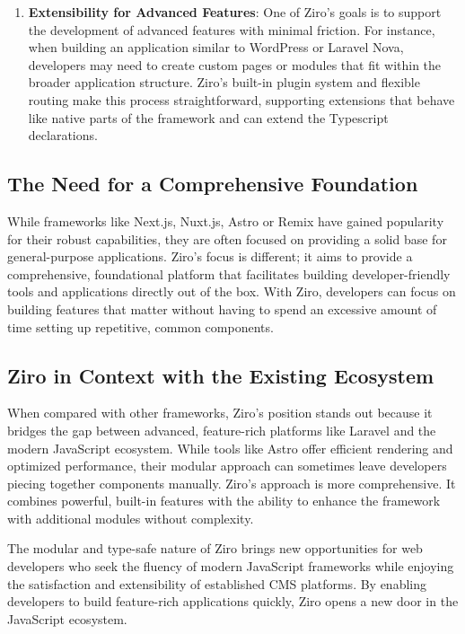 \begin{enumerate}
	\item \textbf{Extensibility for Advanced Features}: One of Ziro’s goals is to support the development of advanced features with minimal friction. For instance, when building an application similar to WordPress or Laravel Nova, developers may need to create custom pages or modules that fit within the broader application structure. Ziro’s built-in plugin system and flexible routing make this process straightforward, supporting extensions that behave like native parts of the framework and can extend the Typescript declarations.
\end{enumerate}


\subsection*{The Need for a Comprehensive Foundation}
While frameworks like Next.js, Nuxt.js, Astro or Remix have gained popularity for their robust capabilities, they are often focused on providing a solid base for general-purpose applications. Ziro’s focus is different; it aims to provide a comprehensive, foundational platform that facilitates building developer-friendly tools and applications directly out of the box. With Ziro, developers can focus on building features that matter without having to spend an excessive amount of time setting up repetitive, common components.

\subsection*{Ziro in Context with the Existing Ecosystem}
When compared with other frameworks, Ziro’s position stands out because it bridges the gap between advanced, feature-rich platforms like Laravel and the modern JavaScript ecosystem. While tools like Astro offer efficient rendering and optimized performance, their modular approach can sometimes leave developers piecing together components manually. Ziro’s approach is more comprehensive. It combines powerful, built-in features with the ability to enhance the framework with additional modules without complexity.

The modular and type-safe nature of Ziro brings new opportunities for web developers who seek the fluency of modern JavaScript frameworks while enjoying the satisfaction and extensibility of established CMS platforms. By enabling developers to build feature-rich applications quickly, Ziro opens a new door in the JavaScript ecosystem.

